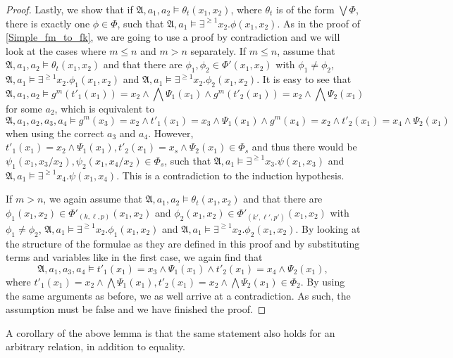 \begin{proof}
	Lastly, we show that if $\mathfrak A,a_1,a_2\models \theta_t(x_1,x_2)$, where $\theta_t$ is of the form $\bigvee \Phi$, there is exactly one $\phi\in\Phi$, such that $\mathfrak A,a_1\models \exists^{\geq 1} x_2.\phi(x_1,x_2)$.
	As in the proof of \cref{Simple_fm_to_fk}, we are going to use a proof by contradiction and we will look at the cases where $m\leq n$ and $m> n$ separately.
	If $m\leq n$, assume that $\mathfrak A,a_1,a_2\models \theta_t(x_1,x_2)$ and that there are $\phi_1,\phi_2\in \Phi'(x_1,x_2)$ with $\phi_1\neq \phi_2$, $\mathfrak A,a_1\models \exists^{\geq 1}x_2.\phi_1(x_1,x_2)$ and $\mathfrak A,a_1\models \exists^{\geq 1}x_2.\phi_2(x_1,x_2)$.
	It is easy to see that 
	$$\mathfrak A,a_1,a_2\models g^m(t'_1(x_1))=x_2 \land \bigwedge \Psi_1(x_1) \land g^m(t'_2(x_1))=x_2 \land \bigwedge\Psi_2(x_1)$$
	for some $a_2$, which is equivalent to
	$$\mathfrak A,a_1,a_2,a_3,a_4\models g^m(x_3)=x_2 \land t'_1(x_1)=x_3\land \Psi_1(x_1) \land g^m(x_4)=x_2 \land t'_2(x_1)=x_4 \land \Psi_2(x_1)$$
	when using the correct $a_3$ and $a_4$.
	However, $t'_1(x_1)=x_2\land \Psi_1(x_1), t'_2(x_1)=x_s \land \Psi_2(x_1) \in \Phi_s$ and thus there would be $\psi_1(x_1,x_3/x_2),\psi_2(x_1,x_4/x_2) \in \Phi_s$, such that $\mathfrak A,a_1\models \exists^{\geq 1}x_3. \psi(x_1,x_3)$ and $\mathfrak A,a_1\models \exists^{\geq 1}x_4.\psi(x_1,x_4)$.
	This is a contradiction to the induction hypothesis.
	
	If $m>n$, we again assume that $\mathfrak A,a_1,a_2\models \theta_t(x_1,x_2)$ and that there are $\phi_1(x_1,x_2)\in\Phi'_{(k,\ell,p)}(x_1,x_2)$ and $\phi_2(x_1,x_2)\in\Phi'_{(k',\ell',p')}(x_1,x_2)$ with $\phi_1\neq \phi_2$, $\mathfrak A,a_1\models \exists^{\geq 1}x_2.\phi_1(x_1,x_2)$ and $\mathfrak A,a_1\models \exists^{\geq 1}x_2.\phi_2(x_1,x_2)$.
	By looking at the structure of the formulae as they are defined in this proof and by substituting terms and variables like in the first case, we again find that 
	$$\mathfrak A,a_1,a_3,a_4\models t'_1(x_1)=x_3\land \Psi_1(x_1) \land t'_2(x_1)=x_4 \land \Psi_2(x_1),$$
	where $t'_1(x_1)=x_2\land\bigwedge \Psi_1(x_1), t'_2(x_1)=x_2\land\bigwedge \Psi_2(x_1)\in \Phi_2$.
	By using the same arguments as before, we as well arrive at a contradiction.
	As such, the assumption must be false and we have finished the proof.
\end{proof}

A corollary of the above lemma is that the same statement also holds for an arbitrary relation, in addition to equality.

